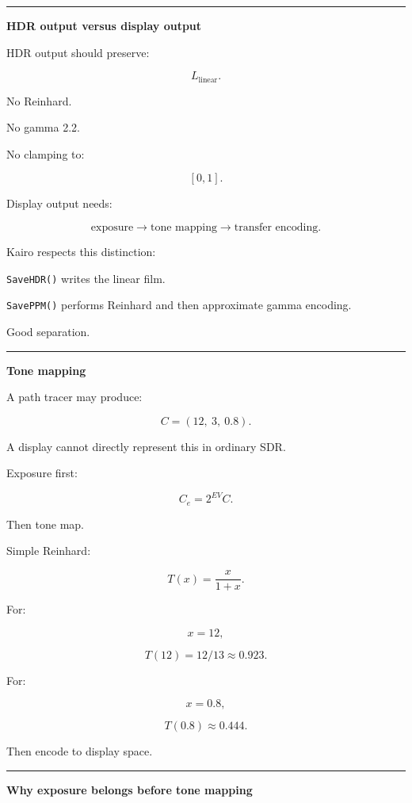 \begin{center}\rule{0.5\linewidth}{0.5pt}\end{center}

\textbf{HDR output versus display output}

HDR output should preserve:

\[
L_{\text{linear}}.
\]

No Reinhard.

No gamma 2.2.

No clamping to:

\[
[0,1].
\]

Display output needs:

\[
\text{exposure}
\rightarrow
\text{tone mapping}
\rightarrow
\text{transfer encoding}.
\]

Kairo respects this distinction:

\texttt{SaveHDR()} writes the linear film.

\texttt{SavePPM()} performs Reinhard and then approximate gamma encoding.

Good separation.

\begin{center}\rule{0.5\linewidth}{0.5pt}\end{center}

\textbf{Tone mapping}

A path tracer may produce:

\[
C=(12,\ 3,\ 0.8).
\]

A display cannot directly represent this in ordinary SDR.

Exposure first:

\[
\boxed{
C_e=
2^{EV}C.
}
\]

Then tone map.

Simple Reinhard:

\[
\boxed{
T(x)=\frac{x}{1+x}.
}
\]

For:

\[
x=12,
\]

\[
T(12)=12/13\approx0.923.
\]

For:

\[
x=0.8,
\]

\[
T(0.8)\approx0.444.
\]

Then encode to display space.

\begin{center}\rule{0.5\linewidth}{0.5pt}\end{center}

\textbf{Why exposure belongs before tone mapping}

